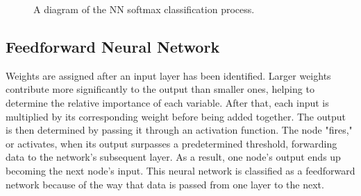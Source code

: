 \begin{figure}[htp]
	\centering
	\caption{A diagram of the NN softmax classification process.}
\end{figure}

\subsection{Feedforward Neural Network}
Weights are assigned after an input layer has been identified. Larger weights contribute more significantly to the output than smaller ones, helping to determine the relative importance of each variable. After that, each input is multiplied by its corresponding weight before being added together. The output is then determined by passing it through an activation function. The node "fires," or activates, when its output surpasses a predetermined threshold, forwarding data to the network's subsequent layer. As a result, one node's output ends up becoming the next node's input. This neural network is classified as a feedforward network because of the way that data is passed from one layer to the next.


